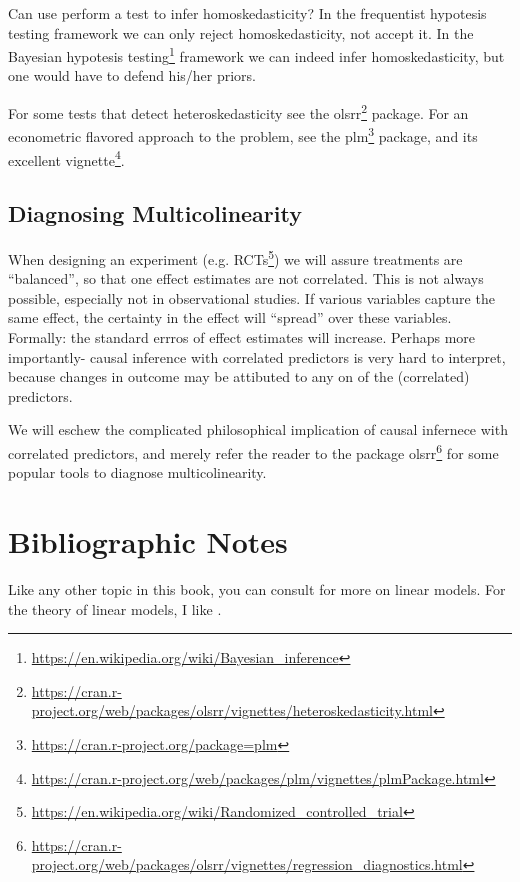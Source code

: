 \documentclass[]{book}
\renewcommand{\href}[2]{#2\footnote{\url{#1}}}
\theoremstyle{definition}
\theoremstyle{definition}
\theoremstyle{definition}
\theoremstyle{remark}
\begin{document}
Can use perform a test to infer homoskedasticity?
In the frequentist hypotesis testing framework we can only reject homoskedasticity, not accept it.
In the \href{https://en.wikipedia.org/wiki/Bayesian_inference}{Bayesian hypotesis testing} framework we can indeed infer homoskedasticity, but one would have to defend his/her priors.

For some tests that detect heteroskedasticity see the \href{https://cran.r-project.org/web/packages/olsrr/vignettes/heteroskedasticity.html}{olsrr} package.
For an econometric flavored approach to the problem, see the \href{https://cran.r-project.org/package=plm}{plm} package, and its excellent \href{https://cran.r-project.org/web/packages/plm/vignettes/plmPackage.html}{vignette}.

\hypertarget{diagnosing-multicolinearity}{%
\subsection{Diagnosing Multicolinearity}\label{diagnosing-multicolinearity}}

When designing an experiment (e.g. \href{https://en.wikipedia.org/wiki/Randomized_controlled_trial}{RCTs}) we will assure treatments are ``balanced'', so that one effect estimates are not correlated.
This is not always possible, especially not in observational studies.
If various variables capture the same effect, the certainty in the effect will ``spread'' over these variables.
Formally: the standard errros of effect estimates will increase.
Perhaps more importantly- causal inference with correlated predictors is very hard to interpret, because changes in outcome may be attibuted to any on of the (correlated) predictors.

We will eschew the complicated philosophical implication of causal infernece with correlated predictors, and merely refer the reader to the package \href{https://cran.r-project.org/web/packages/olsrr/vignettes/regression_diagnostics.html}{olsrr} for some popular tools to diagnose multicolinearity.

\hypertarget{bibliographic-notes-4}{%
\section{Bibliographic Notes}\label{bibliographic-notes-4}}

Like any other topic in this book, you can consult \citet{venables2013modern} for more on linear models.
For the theory of linear models, I like \citet{greene2003econometric}.
\end{document}
